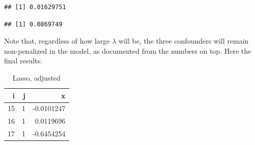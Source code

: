 \documentclass[
]{book}
\newenvironment{Shaded}{\begin{snugshade}}{\end{snugshade}}
\newcommand{\AttributeTok}[1]{\textcolor[rgb]{0.77,0.63,0.00}{#1}}
\newcommand{\CommentTok}[1]{\textcolor[rgb]{0.56,0.35,0.01}{\textit{#1}}}
\newcommand{\ConstantTok}[1]{\textcolor[rgb]{0.00,0.00,0.00}{#1}}
\newcommand{\DecValTok}[1]{\textcolor[rgb]{0.00,0.00,0.81}{#1}}
\newcommand{\FloatTok}[1]{\textcolor[rgb]{0.00,0.00,0.81}{#1}}
\newcommand{\FunctionTok}[1]{\textcolor[rgb]{0.00,0.00,0.00}{#1}}
\newcommand{\NormalTok}[1]{#1}
\newcommand{\OtherTok}[1]{\textcolor[rgb]{0.56,0.35,0.01}{#1}}
\newcommand{\SpecialCharTok}[1]{\textcolor[rgb]{0.00,0.00,0.00}{#1}}
\newcommand{\StringTok}[1]{\textcolor[rgb]{0.31,0.60,0.02}{#1}}
\begin{document}
\begin{verbatim}
## [1] 0.01629751
\end{verbatim}

\begin{Shaded}
\end{Shaded}

\begin{verbatim}
## [1] 0.0869749
\end{verbatim}

Note that, regardless of how large \(\lambda\) will be, the three confounders will remain non-penalized in the model, as documented from the numbers on top. Here the final results:

\begin{Shaded}
\end{Shaded}

\begin{table}

\caption{\label{tab:unnamed-chunk-19}Lasso, adjusted}
\centering
\begin{tabular}[t]{r|r|r}
\hline
i & j & x\\
\hline
15 & 1 & -0.0101247\\
\hline
16 & 1 & 0.0119696\\
\hline
17 & 1 & -0.6454254\\
\hline
\end{tabular}
\end{table}
\end{document}
